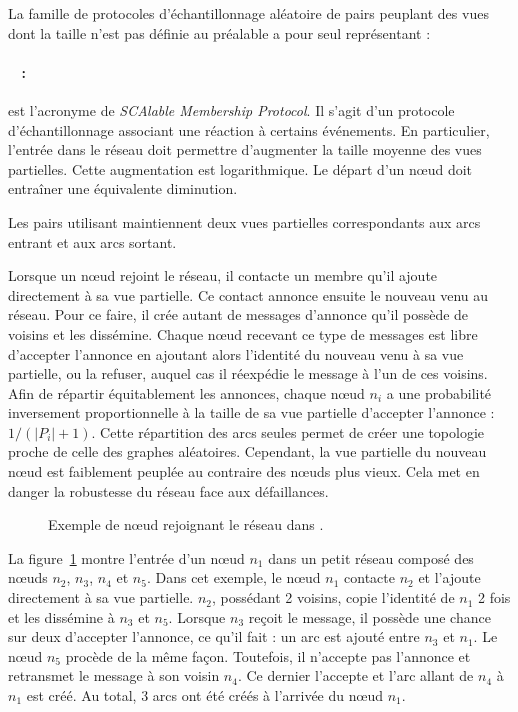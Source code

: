 La famille de protocoles d'échantillonnage aléatoire de pairs peuplant des vues
dont la taille n'est pas définie au préalable a pour seul représentant :

\paragraph{\SCAMP~\cite{ganesh2001scamp, ganesh2003peer} :} est l'acronyme de
\emph{SCAlable Membership Protocol}. Il s'agit d'un protocole d'échantillonnage
associant une réaction à certains événements. En particulier, l'entrée dans le
réseau doit permettre d'augmenter la taille moyenne des vues partielles. Cette
augmentation est logarithmique. Le départ d'un nœud doit entraîner une
équivalente diminution.

\noindent Les pairs utilisant \SCAMP maintiennent deux vues partielles
correspondants aux arcs entrant et aux arcs sortant.

\noindent Lorsque un nœud rejoint le réseau, il contacte un membre qu'il ajoute
directement à sa vue partielle. Ce contact annonce ensuite le nouveau venu au
réseau. Pour ce faire, il crée autant de messages d'annonce qu'il possède de
voisins et les dissémine. Chaque nœud recevant ce type de messages est libre
d'accepter l'annonce en ajoutant alors l'identité du nouveau venu à sa vue
partielle, ou la refuser, auquel cas il réexpédie le message à l'un de ces
voisins. Afin de répartir équitablement les annonces, chaque nœud $n_i$ a une
probabilité inversement proportionnelle à la taille de sa vue partielle
d'accepter l'annonce : $1/(|P_i|+1)$. Cette répartition des arcs seules permet
de créer une topologie proche de celle des graphes aléatoires. Cependant, la vue
partielle du nouveau nœud est faiblement peuplée au contraire des nœuds plus
vieux. Cela met en danger la robustesse du réseau face aux défaillances.

\begin{figure}
  \centering
  
  \caption[Entrée dans un réseau dans \SCAMP]
  {\label{net:fig:scampexample} Exemple de nœud rejoignant le réseau dans
    \SCAMP.}
\end{figure}

\noindent La figure~\ref{net:fig:scampexample} montre l'entrée d'un nœud $n_1$
dans un petit réseau \SCAMP composé des nœuds $n_2$, $n_3$, $n_4$ et $n_5$. Dans
cet exemple, le nœud $n_1$ contacte $n_2$ et l'ajoute directement à sa vue
partielle. $n_2$, possédant 2 voisins, copie l'identité de $n_1$ 2 fois et les
dissémine à $n_3$ et $n_5$. Lorsque $n_3$ reçoit le message, il possède une
chance sur deux d'accepter l'annonce, ce qu'il fait : un arc est ajouté entre
$n_3$ et $n_1$. Le nœud $n_5$ procède de la même façon. Toutefois, il n'accepte
pas l'annonce et retransmet le message à son voisin $n_4$. Ce dernier l'accepte
et l'arc allant de $n_4$ à $n_1$ est créé. Au total, 3 arcs ont été créés à
l'arrivée du nœud $n_1$.


